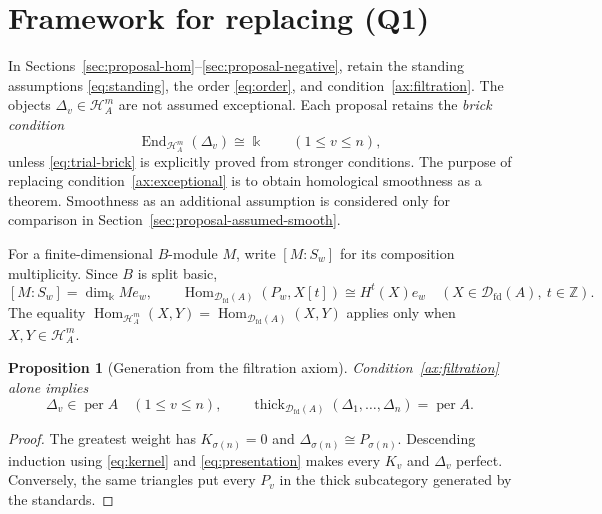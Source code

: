 \documentclass[11pt,a4paper]{article}
\newcommand{\defn}[1]{\textsl{\color{darkblue} #1}}
\newcommand{\D}{\mathcal D}
\renewcommand{\H}{\mathcal H}
\newcommand{\ZZ}{\mathbb{Z}}
\newcommand{\std}{\Delta}
\DeclareMathOperator{\fd}{fd}
\DeclareMathOperator{\Hom}{Hom}
\DeclareMathOperator{\End}{End}
\DeclareMathOperator{\thick}{thick}
\DeclareMathOperator{\per}{per}
\theoremstyle{plain}
\newtheorem{proposition}[theorem]{Proposition}
\theoremstyle{definition}
\numberwithin{equation}{section}
\begin{document}
\section{Framework for replacing (Q1)}\label{sec:comparison-framework}

In Sections~\ref{sec:proposal-hom}--\ref{sec:proposal-negative}, retain
the standing assumptions \eqref{eq:standing}, the order \eqref{eq:order},
and condition~\ref{ax:filtration}. The objects $\std_v\in\H_A^m$
are not assumed exceptional. Each proposal retains the
\defn{brick condition}
\begin{equation}\label{eq:trial-brick}
 \End_{\H_A^m}(\std_v)\cong\Bbbk\qquad(1\leq v\leq n),
\end{equation}
unless \eqref{eq:trial-brick} is explicitly proved from stronger
conditions. The purpose of replacing condition~\ref{ax:exceptional}
is to obtain homological smoothness as a theorem. Smoothness as an
additional assumption is considered only for comparison in
Section~\ref{sec:proposal-assumed-smooth}.

For a finite-dimensional $B$-module $M$, write $[M:S_w]$ for its
composition multiplicity. Since $B$ is split basic,
\begin{equation}\label{eq:trial-projective-test}
 [M:S_w]=\dim_{\Bbbk}Me_w,\qquad
 \Hom_{\D_{\fd}(A)}(P_w,X[t])\cong H^t(X)e_w
 \quad(X\in\D_{\fd}(A),\ t\in\ZZ).
\end{equation}
The equality
$\Hom_{\H_A^m}(X,Y)=\Hom_{\D_{\fd}(A)}(X,Y)$
applies only when $X,Y\in\H_A^m$.

\begin{proposition}[Generation from the filtration axiom]
\label{prop:trial-generation}
Condition~\ref{ax:filtration} alone implies
\begin{equation}\label{eq:trial-generation}
 \std_v\in\per A\quad(1\leq v\leq n),\qquad
 \thick_{\D_{\fd}(A)}(\std_1,\ldots,\std_n)=\per A.
\end{equation}
\end{proposition}
\begin{proof}
The greatest weight has $K_{\sigma(n)}=0$ and
$\std_{\sigma(n)}\cong P_{\sigma(n)}$. Descending induction using
\eqref{eq:kernel} and \eqref{eq:presentation} makes every $K_v$ and
$\std_v$ perfect. Conversely, the same triangles put every $P_v$ in
the thick subcategory generated by the standards.
\end{proof}
\end{document}
